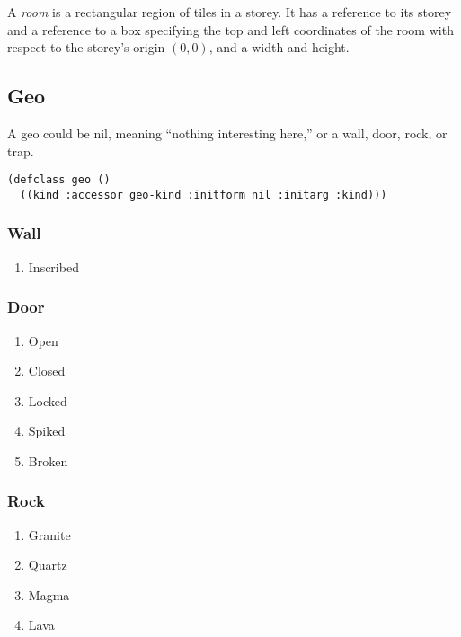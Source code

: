 \documentclass[10pt,oneside,x11names]{article}
\begin{document}
A \emph{room} is a rectangular region of tiles in a storey. It has a reference to its
storey and a reference to a box specifying the top and left coordinates of the
room with respect to the storey's origin \((0,0)\), and a width and height.

\subsection{Geo}
\label{sec:orgheadline46}

A geo could be nil, meaning ``nothing interesting here,'' or a wall, door, rock, or trap.

\begin{verbatim}
(defclass geo ()
  ((kind :accessor geo-kind :initform nil :initarg :kind)))
\end{verbatim}

\subsubsection{Wall}
\label{sec:orgheadline14}
\begin{enumerate}
\item Inscribed
\label{sec:orgheadline13}
\end{enumerate}
\subsubsection{Door}
\label{sec:orgheadline20}
\begin{enumerate}
\item Open
\label{sec:orgheadline15}
\item Closed
\label{sec:orgheadline16}
\item Locked
\label{sec:orgheadline17}
\item Spiked
\label{sec:orgheadline18}
\item Broken
\label{sec:orgheadline19}
\end{enumerate}
\subsubsection{Rock}
\label{sec:orgheadline25}
\begin{enumerate}
\item Granite
\label{sec:orgheadline21}
\item Quartz
\label{sec:orgheadline22}
\item Magma
\label{sec:orgheadline23}
\item Lava
\label{sec:orgheadline24}
\end{enumerate}
\end{document}
